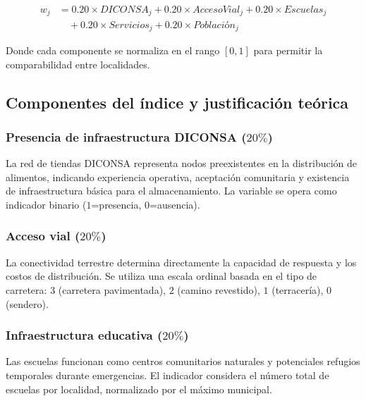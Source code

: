 \documentclass[
  spanish,
  us-letterpaper,
]{scrreprt}
\numberwithin{equation}{section}
\begin{document}
\[
\begin{split}
w_j &= 0.20 \times DICONSA_j + 0.20 \times AccesoVial_j + 0.20 \times Escuelas_j \\
    &\quad + 0.20 \times Servicios_j + 0.20 \times Población_j
\end{split}
\]

Donde cada componente se normaliza en el rango \([0,1]\) para permitir
la comparabilidad entre localidades.

\subsection{Componentes del índice y justificación
teórica}\label{componentes-del-uxedndice-y-justificaciuxf3n-teuxf3rica}

\subsubsection{\texorpdfstring{Presencia de infraestructura DICONSA
(\(20\%\))}{Presencia de infraestructura DICONSA (20\textbackslash\%)}}\label{presencia-de-infraestructura-diconsa-20}

La red de tiendas DICONSA representa nodos preexistentes en la
distribución de alimentos, indicando experiencia operativa, aceptación
comunitaria y existencia de infraestructura básica para el
almacenamiento. La variable se opera como indicador binario
(\(1\)=presencia, \(0\)=ausencia).

\subsubsection{\texorpdfstring{Acceso vial
(\(20\%\))}{Acceso vial (20\textbackslash\%)}}\label{acceso-vial-20}

La conectividad terrestre determina directamente la capacidad de
respuesta y los costos de distribución. Se utiliza una escala ordinal
basada en el tipo de carretera: \(3\) (carretera pavimentada), \(2\)
(camino revestido), \(1\) (terracería), 0 (sendero).

\subsubsection{\texorpdfstring{Infraestructura educativa
(\(20\%\))}{Infraestructura educativa (20\textbackslash\%)}}\label{infraestructura-educativa-20}

Las escuelas funcionan como centros comunitarios naturales y potenciales
refugios temporales durante emergencias. El indicador considera el
número total de escuelas por localidad, normalizado por el máximo
municipal.
\end{document}
